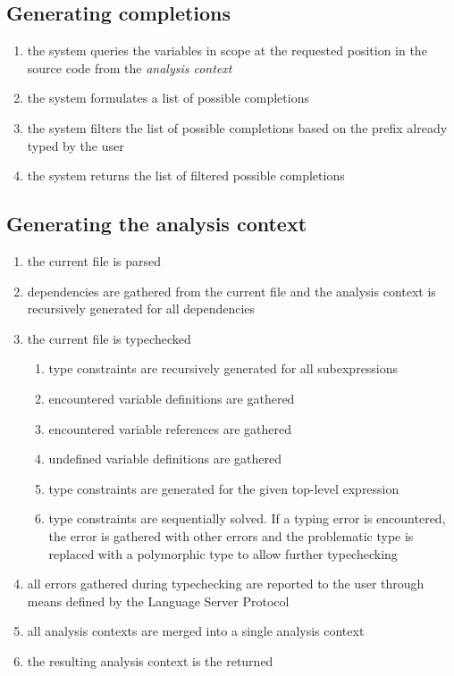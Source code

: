 \documentclass[12pt]{article}
\newcounter{req}
\begin{document}
\subsection{Generating completions}

\begin{enumerate}
  \item the system queries the variables in scope at the requested position in the source code from the \emph{analysis context}
  \item the system formulates a list of possible completions
  \item the system filters the list of possible completions based on the prefix already typed by the user
  \item the system returns the list of filtered possible completions
\end{enumerate}

\subsection{Generating the analysis context}

\begin{enumerate}
  \item the current file is parsed
  \item dependencies are gathered from the current file and the analysis context is recursively generated for all dependencies
  \item the current file is typechecked
        \begin{enumerate}
          \item type constraints are recursively generated for all subexpressions
          \item encountered variable definitions are gathered
          \item encountered variable references are gathered
          \item undefined variable definitions are gathered
          \item type constraints are generated for the given top-level expression
          \item type constraints are sequentially solved. If a typing error is encountered, the error is gathered with other errors and the problematic type is replaced with a polymorphic type to allow further typechecking
        \end{enumerate}
  \item all errors gathered during typechecking are reported to the user through means defined by the Language Server Protocol
  \item all analysis contexts are merged into a single analysis context
  \item the resulting analysis context is the returned
\end{enumerate}
\end{document}
